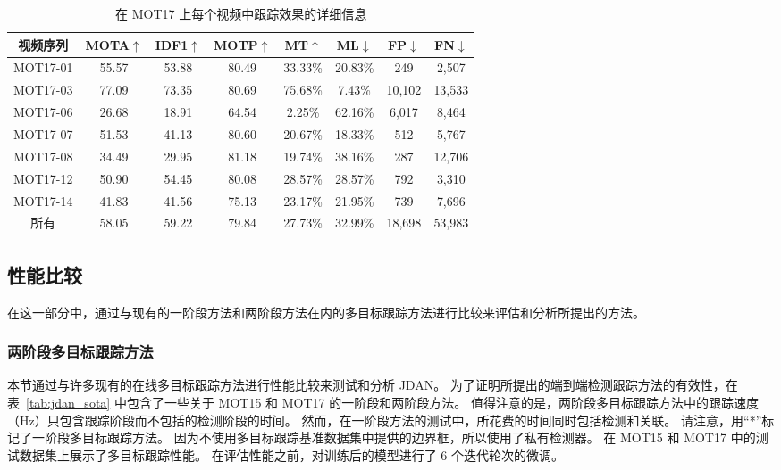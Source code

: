 \vspace{1.0em}
\renewcommand\arraystretch{1.5}
\begin{table}[htbp]\wuhao
	\centering
	\caption{在 MOT17 上每个视频中跟踪效果的详细信息}
	\vspace{0.3em}
	\begin{tabular}{c|ccccccc}
		\hline
		视频序列 & MOTA$\uparrow$ & IDF1$\uparrow$ & MOTP$\uparrow$ & MT$\uparrow$ & ML$\downarrow$ & FP$\downarrow$ & FN$\downarrow$\\
		\hline
		MOT17-01 & 55.57 & 53.88 & 80.49 & 33.33\% & 20.83\% & 249 & 2,507\\
		MOT17-03 & 77.09 & 73.35 & 80.69 & 75.68\% & 7.43\% & 10,102 & 13,533\\
		MOT17-06 & 26.68 & 18.91 & 64.54 & 2.25\% & 62.16\% & 6,017 & 8,464\\
		MOT17-07 & 51.53 & 41.13 & 80.60 & 20.67\% & 18.33\% & 512 & 5,767\\
		MOT17-08 & 34.49 & 29.95 & 81.18 & 19.74\% & 38.16\% & 287 & 12,706\\
		MOT17-12 & 50.90 & 54.45 & 80.08 & 28.57\% & 28.57\% & 792 & 3,310\\
		MOT17-14 & 41.83 & 41.56 & 75.13 & 23.17\% & 21.95\% & 739 & 7,696\\
		\hline
		所有 & 58.05 & 59.22 & 79.84 & 27.73\% & 32.99\% & 18,698 & 53,983\\
		\hline	
	\end{tabular}
	\label{tab:jdan_mot17_detailed}
\end{table}



\subsection{性能比较}
在这一部分中，通过与现有的一阶段方法和两阶段方法在内的多目标跟踪方法进行比较来评估和分析所提出的方法。


\subsubsection{两阶段多目标跟踪方法}
本节通过与许多现有的在线多目标跟踪方法进行性能比较来测试和分析 {JDAN}。
为了证明所提出的端到端检测跟踪方法的有效性，在表~\ref{tab:jdan_sota} 中包含了一些关于 MOT15 和 MOT17 的一阶段和两阶段方法。
值得注意的是，两阶段多目标跟踪方法中的跟踪速度（Hz）只包含跟踪阶段而不包括的检测阶段的时间。
然而，在一阶段方法的测试中，所花费的时间同时包括检测和关联。
请注意，用“*”标记了一阶段多目标跟踪方法。
因为不使用多目标跟踪基准数据集中提供的边界框，所以使用了私有检测器。
在 MOT15 和 MOT17 中的测试数据集上展示了多目标跟踪性能。
在评估性能之前，对训练后的模型进行了 6 个迭代轮次的微调。

